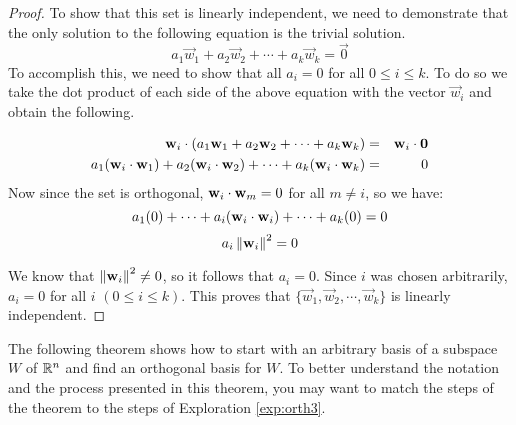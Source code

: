 \documentclass{ximera}
\begin{document}
\begin{proof}
To show that this set is linearly independent, we need to demonstrate that the only solution to the following equation is the trivial solution.
\[
a_1 \vec{w}_1 + a_2 \vec{w}_2 + \cdots + a_k \vec{w}_k = \vec{0}
\]
To accomplish this, we need to show that all $a_i = 0$ for all $0\leq i\leq k$.  To do so we take the dot product of
each side of the above equation with the vector $\vec{w}_i$ and obtain the following.

\begin{eqnarray*}
\mathbf{w}_i \cdot (a_1 \mathbf{w}_1 + a_2 \mathbf{w}_2 + \cdots + a_k \mathbf{w}_k ) &=& \mathbf{w}_i \cdot \mathbf{0}\\
a_1 (\mathbf{w}_i \cdot \mathbf{w}_1) + a_2 (\mathbf{w}_i \cdot \mathbf{w}_2) + \cdots + a_k (\mathbf{w}_i \cdot \mathbf{w}_k)  &=& 0
\end{eqnarray*}
Now since the set is orthogonal, $\mathbf{w}_i \cdot \mathbf{w}_m = 0$ for all $m \neq i$, so we have:
\[
a_1 (0) + \cdots + a_i(\mathbf{w}_i \cdot \mathbf{w}_i) + \cdots + a_k (0) = 0
\]
\[
a_i \left\lVert\mathbf{w}_i\right\rVert^2 = 0
\]

We know that $\left\lVert\mathbf{w}_i\right\rVert^2  \neq 0$, so it follows that $a_i =0$. Since $i$ was chosen arbitrarily, $a_i =0$ for all $i$ $(0\leq i\leq k)$. This proves that $\{ \vec{w}_1, \vec{w}_2, \cdots, \vec{w}_k \}$ is linearly independent.


\end{proof}


The following theorem shows how to start with an arbitrary basis of a subspace $W$ of $\mathbb{R}^n$ and find an orthogonal basis for $W$.  To better understand the notation and the process presented in this theorem, you may want to match the steps of the theorem to the steps of Exploration \ref{exp:orth3}.
\end{document}
